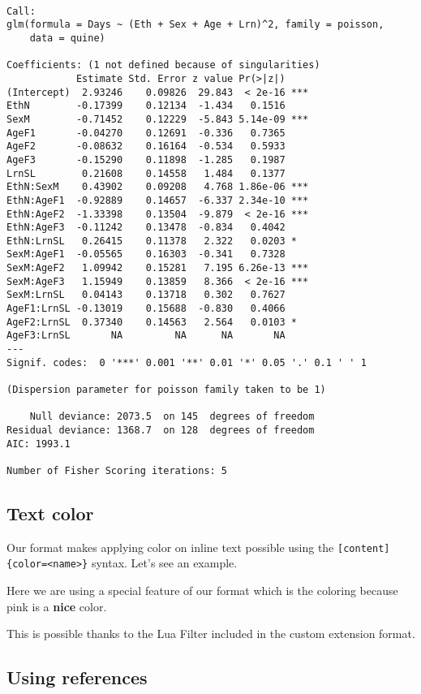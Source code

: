 \documentclass[
  11pts,
]{article}
\begin{document}
\begin{verbatim}

Call:
glm(formula = Days ~ (Eth + Sex + Age + Lrn)^2, family = poisson, 
    data = quine)

Coefficients: (1 not defined because of singularities)
            Estimate Std. Error z value Pr(>|z|)    
(Intercept)  2.93246    0.09826  29.843  < 2e-16 ***
EthN        -0.17399    0.12134  -1.434   0.1516    
SexM        -0.71452    0.12229  -5.843 5.14e-09 ***
AgeF1       -0.04270    0.12691  -0.336   0.7365    
AgeF2       -0.08632    0.16164  -0.534   0.5933    
AgeF3       -0.15290    0.11898  -1.285   0.1987    
LrnSL        0.21608    0.14558   1.484   0.1377    
EthN:SexM    0.43902    0.09208   4.768 1.86e-06 ***
EthN:AgeF1  -0.92889    0.14657  -6.337 2.34e-10 ***
EthN:AgeF2  -1.33398    0.13504  -9.879  < 2e-16 ***
EthN:AgeF3  -0.11242    0.13478  -0.834   0.4042    
EthN:LrnSL   0.26415    0.11378   2.322   0.0203 *  
SexM:AgeF1  -0.05565    0.16303  -0.341   0.7328    
SexM:AgeF2   1.09942    0.15281   7.195 6.26e-13 ***
SexM:AgeF3   1.15949    0.13859   8.366  < 2e-16 ***
SexM:LrnSL   0.04143    0.13718   0.302   0.7627    
AgeF1:LrnSL -0.13019    0.15688  -0.830   0.4066    
AgeF2:LrnSL  0.37340    0.14563   2.564   0.0103 *  
AgeF3:LrnSL       NA         NA      NA       NA    
---
Signif. codes:  0 '***' 0.001 '**' 0.01 '*' 0.05 '.' 0.1 ' ' 1

(Dispersion parameter for poisson family taken to be 1)

    Null deviance: 2073.5  on 145  degrees of freedom
Residual deviance: 1368.7  on 128  degrees of freedom
AIC: 1993.1

Number of Fisher Scoring iterations: 5
\end{verbatim}

\subsection{Text color}\label{sec-summary}

Our format makes applying color on inline text possible using the
\texttt{{[}content{]}\{color=\textless{}name\textgreater{}\}} syntax.
Let's see an example.

Here we are using a special feature of our format which is the coloring
because {pink is a \textbf{nice} color}.

This is possible thanks to the Lua Filter included in the custom
extension format.

\subsection*{Using references}\label{using-references}
\end{document}
